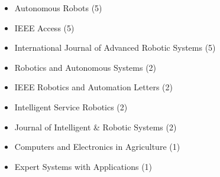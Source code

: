 \begin{itemize}
	\item Autonomous Robots (5)
	\item IEEE Access (5)
	\item International Journal of Advanced Robotic Systems (5)
	\item Robotics and Autonomous Systems (2)
	\item IEEE Robotics and Automation Letters (2)
	\item Intelligent Service Robotics (2)
	\item Journal of Intelligent \& Robotic Systems (2)
	\item Computers and Electronics in Agriculture (1)
	\item Expert Systems with Applications (1)
\end{itemize}
